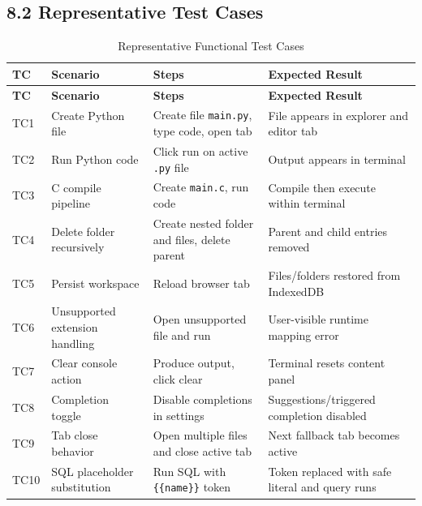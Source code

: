 \subsection*{8.2 Representative Test Cases}
\begin{longtable}{p{0.9cm}p{4.2cm}p{4.4cm}p{4.0cm}}
\caption{Representative Functional Test Cases}\\
\toprule
\textbf{TC} & \textbf{Scenario} & \textbf{Steps} & \textbf{Expected Result} \\
\midrule
\endfirsthead
\toprule
\textbf{TC} & \textbf{Scenario} & \textbf{Steps} & \textbf{Expected Result} \\
\midrule
\endhead
TC1 & Create Python file & Create file \texttt{main.py}, type code, open tab & File appears in explorer and editor tab \\
TC2 & Run Python code & Click run on active \texttt{.py} file & Output appears in terminal \\
TC3 & C compile pipeline & Create \texttt{main.c}, run code & Compile then execute within terminal \\
TC4 & Delete folder recursively & Create nested folder and files, delete parent & Parent and child entries removed \\
TC5 & Persist workspace & Reload browser tab & Files/folders restored from IndexedDB \\
TC6 & Unsupported extension handling & Open unsupported file and run & User-visible runtime mapping error \\
TC7 & Clear console action & Produce output, click clear & Terminal resets content panel \\
TC8 & Completion toggle & Disable completions in settings & Suggestions/triggered completion disabled \\
TC9 & Tab close behavior & Open multiple files and close active tab & Next fallback tab becomes active \\
TC10 & SQL placeholder substitution & Run SQL with \texttt{{\{\{name\}\}}} token & Token replaced with safe literal and query runs \\
\bottomrule
\end{longtable}

